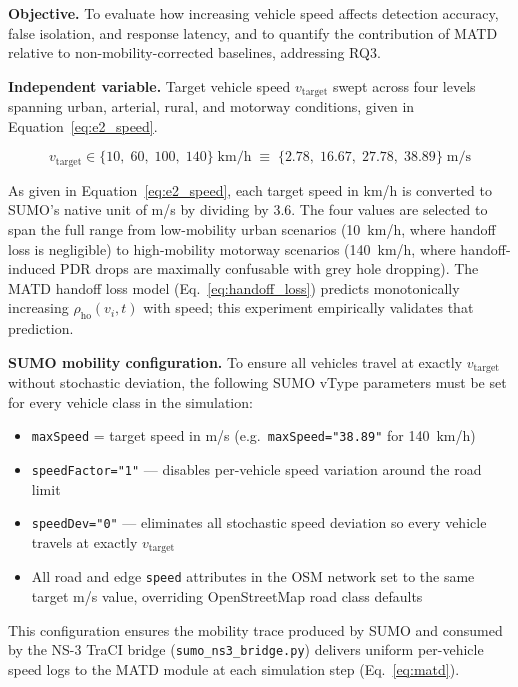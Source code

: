 \documentclass[12pt, a4paper]{report}
\newcommand{\mypar}{\vspace{0.8em}\noindent}
\begin{document}
\mypar
\textbf{Objective.}
To evaluate how increasing vehicle speed affects detection accuracy,
false isolation, and response latency, and to quantify the contribution
of MATD relative to non-mobility-corrected baselines, addressing RQ3.

\mypar
\textbf{Independent variable.}
Target vehicle speed $v_{\text{target}}$ swept across four levels
spanning urban, arterial, rural, and motorway conditions, given in
Equation~\eqref{eq:e2_speed}.

\begin{equation}
\label{eq:e2_speed}
v_{\text{target}} \in \{10,\; 60,\; 100,\; 140\}\;\text{km/h}
\;\equiv\;
\{2.78,\; 16.67,\; 27.78,\; 38.89\}\;\text{m/s}
\end{equation}

As given in Equation~\eqref{eq:e2_speed}, each target speed in km/h
is converted to SUMO's native unit of m/s by dividing by 3.6. The
four values are selected to span the full range from low-mobility
urban scenarios (10~km/h, where handoff loss is negligible) to
high-mobility motorway scenarios (140~km/h, where handoff-induced
PDR drops are maximally confusable with grey hole dropping). The
MATD handoff loss model (Eq.~\eqref{eq:handoff_loss}) predicts
monotonically increasing $\rho_{\text{ho}}(v_i,t)$ with speed; this
experiment empirically validates that prediction.

\mypar
\textbf{SUMO mobility configuration.}
To ensure all vehicles travel at exactly $v_{\text{target}}$ without
stochastic deviation, the following SUMO vType parameters must be set
for every vehicle class in the simulation:

\begin{itemize}
  \item \texttt{maxSpeed} = target speed in m/s
        (e.g.\ \texttt{maxSpeed="38.89"} for 140~km/h)
  \item \texttt{speedFactor="1"} — disables per-vehicle speed
        variation around the road limit
  \item \texttt{speedDev="0"} — eliminates all stochastic speed
        deviation so every vehicle travels at exactly
        $v_{\text{target}}$
  \item All road and edge \texttt{speed} attributes in the OSM
        network set to the same target m/s value, overriding
        OpenStreetMap road class defaults
\end{itemize}

\noindent This configuration ensures the mobility trace produced by
SUMO and consumed by the NS-3 TraCI bridge
(\texttt{sumo\_ns3\_bridge.py}) delivers uniform per-vehicle speed
logs to the MATD module at each simulation step
(Eq.~\eqref{eq:matd}).
\end{document}
